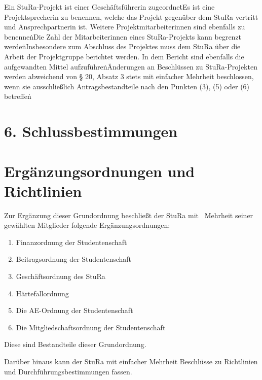 \begin{multicols}{2}
\Abs \Satz Ein StuRa-Projekt ist einer Geschäftsführerin zugeordnet\.

\Abs \Satz Es ist eine Projektsprecherin zu benennen, welche das Projekt gegenüber dem StuRa vertritt und Ansprechpartnerin ist. Weitere Projektmitarbeiterinnen sind ebenfalls zu benennen\.

\Abs \Satz Die Zahl der Mitarbeiterinnen eines StuRa-Projekts kann begrenzt werden\.

\Abs \Satz Insbesondere zum Abschluss des Projektes muss dem StuRa über die Arbeit der Projektgruppe berichtet werden. In dem Bericht sind ebenfalls die aufgewandten Mittel aufzuführen\.

\Abs \Satz Änderungen an Beschlüssen zu StuRa-Projekten werden abweichend von § 20, Absatz 3 stets mit einfacher Mehrheit beschlossen, wenn sie ausschließlich Antragsbestandteile nach den Punkten (3), (5) oder (6) betreffen\.


\setcounter{section}{28}


\section*{6. Schlussbestimmungen}



\section{Ergänzungsordnungen und Richtlinien}

\Abs \Satz Zur Ergänzung dieser Grundordnung beschließt der StuRa mit ~Mehrheit seiner gewählten Mitglieder folgende Ergänzungsordnungen:
\begin{enumerate}
\item Finanzordnung der Studentenschaft
\item Beitragsordnung der Studentenschaft
\item Geschäftsordnung des StuRa
\item Härtefallordnung
\item Die AE-Ordnung der Studentenschaft
\item Die Mitgliedschaftsordnung der Studentenschaft
\end{enumerate}

\Abs \Satz Diese sind Bestandteile dieser Grundordnung.

\Abs \Satz Darüber hinaus kann der StuRa mit einfacher Mehrheit Beschlüsse zu Richtlinien und Durchführungsbestimmungen fassen.




\end{multicols}
